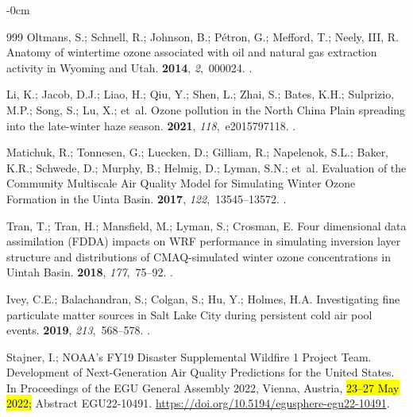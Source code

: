 \documentclass[air,article,accept,moreauthors]{Definitions/mdpi}
\begin{document}
\begin{adjustwidth}{-\extralength}{0cm}
\begin{thebibliography}{999}
Oltmans, S.; Schnell, R.; Johnson, B.; Pétron, G.; Mefford, T.; Neely, III, R.
\newblock Anatomy of wintertime ozone associated with oil and natural gas extraction activity in Wyoming and Utah.
 {\bf 2014}, {\em 2},~000024.
.

Li, K.; Jacob, D.J.; Liao, H.; Qiu, Y.; Shen, L.; Zhai, S.; Bates, K.H.; Sulprizio, M.P.; Song, S.; Lu, X.;  et~al.
\newblock Ozone pollution in the North China Plain spreading into the late-winter haze season.
 {\bf 2021}, {\em 118},~e2015797118.
.

Matichuk, R.; Tonnesen, G.; Luecken, D.; Gilliam, R.; Napelenok, S.L.; Baker, K.R.; Schwede, D.; Murphy, B.; Helmig, D.; Lyman, S.N.;  et~al.
\newblock Evaluation of the Community Multiscale Air Quality Model for Simulating Winter Ozone Formation in the Uinta Basin.
 {\bf 2017}, {\em 122},~13545--13572.
.

Tran, T.; Tran, H.; Mansfield, M.; Lyman, S.; Crosman, E.
\newblock Four dimensional data assimilation ({FDDA}) impacts on {WRF} performance in simulating inversion layer structure and distributions of {CMAQ}-simulated winter ozone concentrations in {Uintah Basin}.
 {\bf 2018}, {\em 177},~75--92.
.

Ivey, C.E.; Balachandran, S.; Colgan, S.; Hu, Y.; Holmes, H.A.
\newblock Investigating fine particulate matter sources in Salt Lake City during persistent cold air pool events.
 {\bf 2019}, {\em 213},~568--578.
.

Stajner, I.; {NOAA's FY19 Disaster Supplemental Wildfire 1 Project Team}.
\newblock Development of Next-Generation Air Quality Predictions for the United States.
\newblock In Proceedings of the EGU General Assembly 2022, Vienna, Austria,  \hl{23–27 May 2022;} %
\newblock Abstract EGU22-10491. {\url{https://doi.org/10.5194/egusphere-egu22-10491}}.


\end{thebibliography}
\end{adjustwidth}
\end{document}
